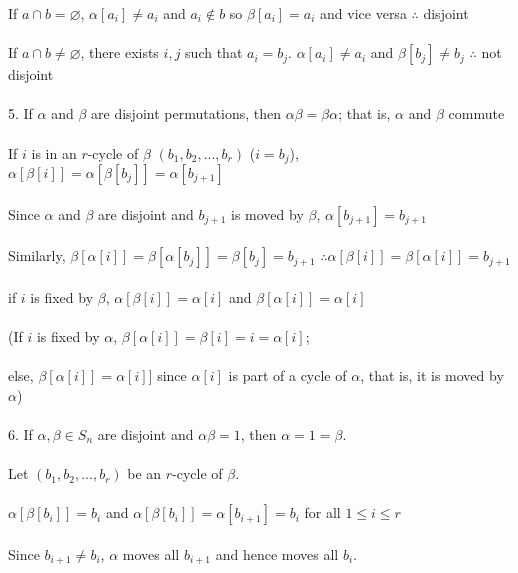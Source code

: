 \documentclass{article}
\begin{document}
\begin{siderules}
\null\qquad If \(a\cap b=\varnothing\), \(\alpha[a_i]\neq a_i\) and \(a_i\notin b\) so \(\beta[a_i]=a_i\) and vice versa \(\therefore\) disjoint\\\\
\null\qquad If \(a\cap b\neq\varnothing\), there exists \(i,j\) such that \(a_i=b_j\). \(\alpha[a_i]\neq a_i\) and \(\beta[b_j]\neq b_j\) \(\therefore\) not disjoint\\\\
\color{blue}5. If \(\alpha\) and \(\beta\) are disjoint permutations, then \(\alpha\beta=\beta\alpha\); that is, \(\alpha\) and \(\beta\) commute\color{black}\\\\
\null\qquad If \(i\) is in an \(r\)-cycle of \(\beta\) \((b_1,b_2,...,b_r)\) (\(i=b_j\)), \(\alpha[\beta[i]]=\alpha[\beta[b_j]]=\alpha[b_{j+1}]\)\\\\
\null\qquad Since \(\alpha\) and \(\beta\) are disjoint and \(b_{j+1}\) is moved by \(\beta\), \(\alpha[b_{j+1}]=b_{j+1}\)\\\\
\null\qquad Similarly, \(\beta[\alpha[i]]=\beta[\alpha[b_j]]=\beta[b_j]=b_{j+1}\) \(\therefore\alpha[\beta[i]]=\beta[\alpha[i]]=b_{j+1}\)\\\\
\null\qquad if \(i\) is fixed by \(\beta\), \(\alpha[\beta[i]]=\alpha[i]\) and \(\beta[\alpha[i]]=\alpha[i]\)\\\\
\null\qquad (If \(i\) is fixed by \(\alpha\), \(\beta[\alpha[i]]=\beta[i]=i=\alpha[i]\);\\\\
\null\qquad else, \(\beta[\alpha[i]]=\alpha[i]]\) since \(\alpha[i]\) is part of a cycle of \(\alpha\), that is, it is moved by \(\alpha\))\\\\
\color{blue}6. If \(\alpha,\beta\in S_n\) are disjoint and \(\alpha\beta=1\), then \(\alpha=1=\beta\).\color{black}\\\\
\null\qquad Let \((b_1,b_2,...,b_r)\) be an \(r\)-cycle of \(\beta\).\\\\
\null\qquad \(\alpha[\beta[b_i]]=b_i\) and \(\alpha[\beta[b_i]]=\alpha[b_{i+1}]=b_i\) for all \(1\le i\le r\)\\\\
\null\qquad Since \(b_{i+1}\neq b_i\), \(\alpha\) moves all \(b_{i+1}\) and hence moves all \(b_i\).\\\\

\end{siderules}
\end{document}

